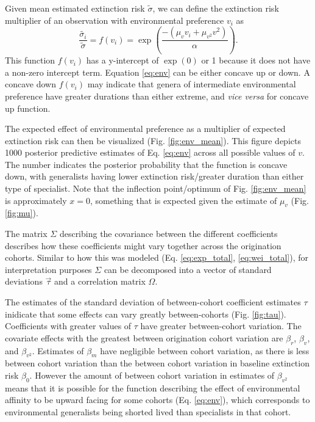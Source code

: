\documentclass[12pt,letterpaper]{article}
\begin{document}
Given mean estimated extinction risk \(\tilde{\sigma}\), we can define the extinction risk multiplier of an observation with environmental preference \(v_{i}\) as 
\begin{equation}
  \frac{\tilde{\sigma_{i}}}{\tilde{\sigma}} = f(v_{i}) = \exp\left(\frac{-(\mu_{v} v_{i} + \mu_{v^{2}} v^{2})}{\alpha}\right).
  \label{eq:env}
\end{equation}
This function \(f(v_{i})\) has a y-intercept of \(\exp(0)\) or 1 because it does not have a non-zero intercept term. Equation \ref{eq:env} can be either concave up or down. A concave down \(f(v_{i})\) may indicate that genera of intermediate environmental preference have greater durations than either extreme, and \textit{vice versa} for concave up function.

The expected effect of environmental preference as a multiplier of expected extinction risk can then be visualized (Fig. \ref{fig:env_mean}). This figure depicts 1000 posterior predictive estimates of Eq. \ref{eq:env} across all possible values of \(v\). The number indicates the posterior probability that the function is concave down, with generalists having lower extinction risk/greater duration than either type of specialist. Note that the inflection point/optimum of Fig. \ref{fig:env_mean} is approximately \(x = 0\), something that is expected given the estimate of \(\mu_{v}\) (Fig. \ref{fig:mu}).

The matrix \(\Sigma\) describing the covariance between the different coefficients describes how these coefficients might vary together across the origination cohorts. Similar to how this was modeled (Eq. \ref{eq:exp_total}, \ref{eq:wei_total}), for interpretation purposes \(\Sigma\) can be decomposed into a vector of standard deviations \(\vec{\tau}\) and a correlation matrix \(\Omega\).

The estimates of the standard deviation of between-cohort coefficient estimates \(\tau\) inidicate that some effects can vary greatly between-cohorts (Fig. \ref{fig:tau}). Coefficients with greater values of \(\tau\) have greater between-cohort variation. The covariate effects with the greatest between origination cohort variation are \(\beta_{r}\), \(\beta_{v}\), and \(\beta_{v^{2}}\). Estimates of \(\beta_{m}\) have negligible between cohort variation, as there is less between cohort variation than the between cohort variation in baseline extinction risk \(\beta_{0}\). However the amount of between cohort variation in estimates of \(\beta_{v^{2}}\) means that it is possible for the function describing the effect of environmental affinity to be upward facing for some cohorts (Eq. \ref{eq:env}), which corresponds to environmental generalists being shorted lived than specialists in that cohort.
\end{document}
